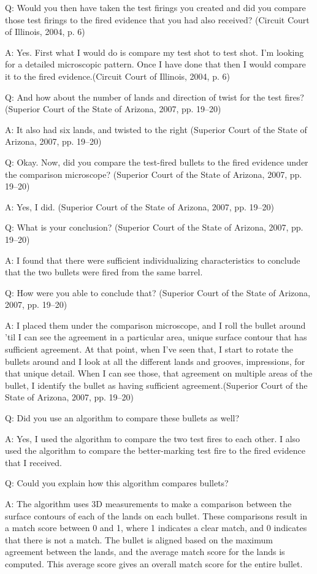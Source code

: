 \documentclass[print]{nuthesis}
\begin{document}
Q: Would you then have taken the test firings you created and did you compare those test firings to the fired evidence that you had also received? (Circuit Court of Illinois, 2004, p. 6)

A: Yes. First what I would do is compare my test shot to test shot.
I'm looking for a detailed microscopic pattern.
Once I have done that then I would compare it to the fired evidence.(Circuit Court of Illinois, 2004, p. 6)

Q: And how about the number of lands and direction of twist for the test fires? (Superior Court of the State of Arizona, 2007, pp. 19--20)

A: It also had six lands, and twisted to the right (Superior Court of the State of Arizona, 2007, pp. 19--20)

Q: Okay. Now, did you compare the test-fired bullets to the fired evidence under the comparison microscope? (Superior Court of the State of Arizona, 2007, pp. 19--20)

A: Yes, I did. (Superior Court of the State of Arizona, 2007, pp. 19--20)

Q: What is your conclusion? (Superior Court of the State of Arizona, 2007, pp. 19--20)

A: I found that there were sufficient individualizing characteristics to conclude that the two bullets were fired from the same barrel.

Q: How were you able to conclude that? (Superior Court of the State of Arizona, 2007, pp. 19--20)

A: I placed them under the comparison microscope, and I roll the bullet around 'til I can see the agreement in a particular area, unique surface contour that has sufficient agreement.
At that point, when I've seen that, I start to rotate the bullets around and I look at all the different lands and grooves, impressions, for that unique detail.
When I can see those, that agreement on multiple areas of the bullet, I identify the bullet as having sufficient agreement.(Superior Court of the State of Arizona, 2007, pp. 19--20)

Q: Did you use an algorithm to compare these bullets as well?

A: Yes, I used the algorithm to compare the two test fires to each other.
I also used the algorithm to compare the better-marking test fire to the fired evidence that I received.

Q: Could you explain how this algorithm compares bullets?

A: The algorithm uses 3D measurements to make a comparison between the surface contours of each of the lands on each bullet.
These comparisons result in a match score between 0 and 1, where 1 indicates a clear match, and 0 indicates that there is not a match.
The bullet is aligned based on the maximum agreement between the lands, and the average match score for the lands is computed.
This average score gives an overall match score for the entire bullet.
\end{document}

